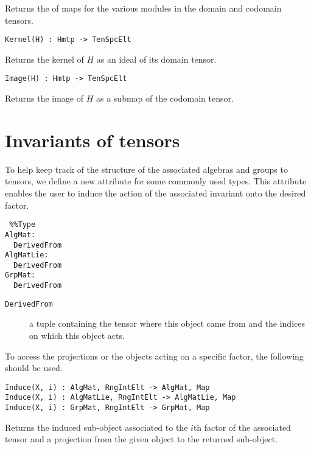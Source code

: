 \documentclass{amsart}
\begin{document}
Returns the of maps for the various modules in the domain and codomain tensors.

\color{blue}
{\small \begin{verbatim}
Kernel(H) : Hmtp -> TenSpcElt
\end{verbatim} }
\color{black}

Returns the kernel of $H$ as an ideal of its domain tensor.

\color{blue}
{\small \begin{verbatim}
Image(H) : Hmtp -> TenSpcElt
\end{verbatim} }
\color{black}

Returns the image of $H$ as a submap of the codomain tensor.

\section{Invariants of tensors}

To help keep track of the structure of the associated algebras and groups to 
tensors, we define a new attribute for some commonly used types. This attribute 
enables the user to induce the action of the associated invariant onto the 
desired factor.

\color{blue}
{\small \begin{verbatim} %%Type
AlgMat:
  DerivedFrom
AlgMatLie:
  DerivedFrom
GrpMat:
  DerivedFrom
\end{verbatim} }
\color{black}

\begin{description}
\item[{\tt DerivedFrom}] a tuple containing the tensor where this object came
from and the indices on which this object acts.
\end{description}

To access the projections or the objects acting on a specific factor, the 
following should be used.

\color{blue}
{\small \begin{verbatim}
Induce(X, i) : AlgMat, RngIntElt -> AlgMat, Map
Induce(X, i) : AlgMatLie, RngIntElt -> AlgMatLie, Map
Induce(X, i) : GrpMat, RngIntElt -> GrpMat, Map
\end{verbatim} }
\color{black}

Returns the induced sub-object associated to the $i$th factor of the associated 
tensor and a projection from the given object to the returned sub-object.
\end{document}
